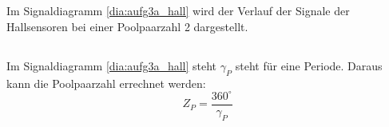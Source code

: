 \chapter{}\label{ex:aufg3}
%
\section{}\label{sec:aufg3a}
Im Signaldiagramm \ref{dia:aufg3a_hall} wird der Verlauf der Signale der Hallsensoren bei einer Poolpaarzahl 2 dargestellt. 


%
\section{}\label{sec:aufg3b}
Im Signaldiagramm \ref{dia:aufg3a_hall} steht $\gamma_P$ steht f\"ur eine Periode.
Daraus kann die Poolpaarzahl errechnet werden:
\begin{equation}
Z_P = \frac{360^\circ}{\gamma_P}
\label{for:poolpaarZahl}
\end{equation}
%